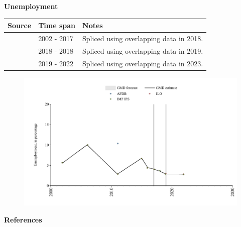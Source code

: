 \documentclass[12pt,a4paper,landscape]{article}
\begin{document}
\begin{adjustbox}{max totalsize={\paperwidth}{\paperheight},center}
\begin{minipage}[t][\textheight][t]{\textwidth}
\vspace*{0.5cm}
{}
\begin{center}
{\Large\bfseries Unemployment}
\end{center}
\vspace{0.5cm}
\begin{table}[H]
\centering
\small
\begin{tabular}{|l|l|l|}
\hline
\textbf{Source} & \textbf{Time span} & \textbf{Notes} \\
\hline
\rowcolor{white}\cite{ILO}& 2002 - 2017 &Spliced using overlapping data in 2018. \\
\rowcolor{lightgray}\cite{IMF_IFS}& 2018 - 2018 &Spliced using overlapping data in 2019. \\
\rowcolor{white}\cite{ILO}& 2019 - 2022 &Spliced using overlapping data in 2023. \\
\hline
\end{tabular}
\end{table}
\begin{figure}[H]
\centering
\includegraphics[width=\textwidth,height=0.6\textheight,keepaspectratio]{graphs/SEN_unemp.pdf}
\end{figure}
\end{minipage}
\end{adjustbox}
{}
\begin{center}
{\Large\bfseries References}
\end{center}
\small


\end{document}
